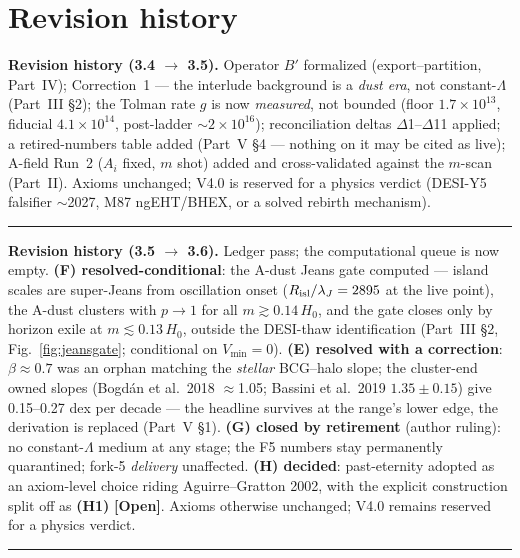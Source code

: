 \documentclass[11pt]{article}
\newcommand{\open}{\textcolor{red!70!black}{\textbf{[Open]}}}
\begin{document}
\part*{Revision history}
{\small
\noindent\textbf{Revision history (3.4 $\to$ 3.5).} Operator $B'$ formalized (export--partition, Part~IV); Correction~1 --- the interlude background is a \emph{dust era}, not constant-$\Lambda$ (Part~III \S2); the Tolman rate $g$ is now \emph{measured}, not bounded (floor $1.7\times10^{13}$, fiducial $4.1\times10^{14}$, post-ladder $\sim$$2\times10^{16}$); reconciliation deltas $\Delta$1--$\Delta$11 applied; a retired-numbers table added (Part~V \S4 --- nothing on it may be cited as live); A-field Run~2 ($A_i$ fixed, $m$ shot) added and cross-validated against the $m$-scan (Part~II). Axioms unchanged; V4.0 is reserved for a physics verdict (DESI-Y5 falsifier $\sim$2027, M87 ngEHT/BHEX, or a solved rebirth mechanism).
\vspace{4pt}\hrule\vspace{4pt}
\noindent\textbf{Revision history (3.5 $\to$ 3.6).} Ledger pass; the computational queue is now empty. \textbf{(F) resolved-conditional}: the A-dust Jeans gate computed --- island scales are super-Jeans from oscillation onset ($R_{\rm isl}/\lambda_J=2895$ at the live point), the A-dust clusters with $p\to1$ for all $m\gtrsim0.14\,H_0$, and the gate closes only by horizon exile at $m\lesssim0.13\,H_0$, outside the DESI-thaw identification (Part~III \S2, Fig.~\ref{fig:jeansgate}; conditional on $V_{\min}=0$). \textbf{(E) resolved with a correction}: $\beta\approx0.7$ was an orphan matching the \emph{stellar} BCG--halo slope; the cluster-end owned slopes (Bogd\'an et al.\ 2018 $\approx$1.05; Bassini et al.\ 2019 $1.35\pm0.15$) give 0.15--0.27 dex per decade --- the headline survives at the range's lower edge, the derivation is replaced (Part~V \S1). \textbf{(G) closed by retirement} (author ruling): no constant-$\Lambda$ medium at any stage; the F5 numbers stay permanently quarantined; fork-5 \emph{delivery} unaffected. \textbf{(H) decided}: past-eternity adopted as an axiom-level choice riding Aguirre--Gratton 2002, with the explicit construction split off as \textbf{(H1)} \open. Axioms otherwise unchanged; V4.0 remains reserved for a physics verdict.
\vspace{4pt}\hrule\vspace{4pt}
$$}
\end{document}
